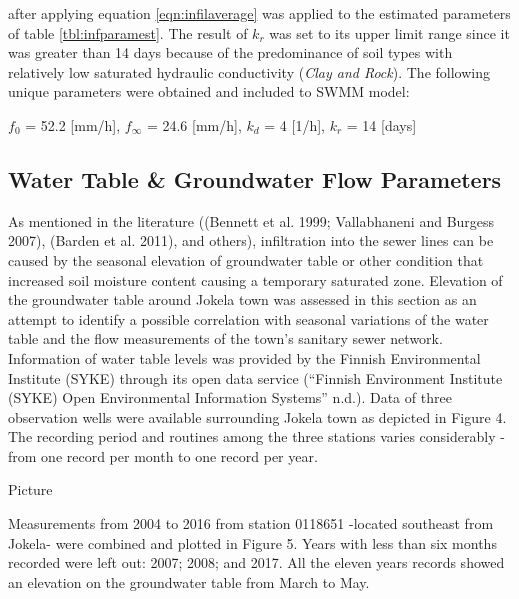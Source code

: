 after applying equation \ref{eqn:infilaverage} was applied to the estimated parameters of table \ref{tbl:infparamest}. The result of $k_r$ was set to its upper limit range since it was greater than 14 days because of the predominance of soil types with relatively low saturated hydraulic conductivity (\textit{Clay and Rock}). The following unique parameters were obtained and included to SWMM model:

\begin{center}
  $f_0$ = 52.2 [mm/h], $f_\infty$ = 24.6 [mm/h], $k_d$ = 4 [1/h], $k_r$ = 14 [days]  
\end{center}






\subsection{Water Table \& Groundwater Flow Parameters} \label{gwcs}

As mentioned in the literature ((Bennett et al. 1999; Vallabhaneni and Burgess 2007), (Barden et al. 2011), and others), infiltration into the sewer lines can be caused by the seasonal elevation of groundwater table or other condition that increased soil moisture content causing a temporary saturated zone. Elevation of the groundwater table around Jokela town was assessed in this section as an attempt to identify a possible correlation with seasonal variations of the water table and the flow measurements of the town’s sanitary sewer network. 
Information of water table levels was provided by the Finnish Environmental Institute (SYKE) through its open data service (“Finnish Environment Institute (SYKE) Open Environmental Information Systems” n.d.). Data of three observation wells were available surrounding Jokela town as depicted in Figure 4. The recording period and routines among the three stations varies considerably - from one record per month to one record per year.

Picture

Measurements from 2004 to 2016 from station 0118651 -located southeast from Jokela- were combined and plotted in Figure 5. Years with less than six months recorded were left out: 2007; 2008; and 2017. All the eleven years records showed an elevation on the groundwater table from March to May. 

